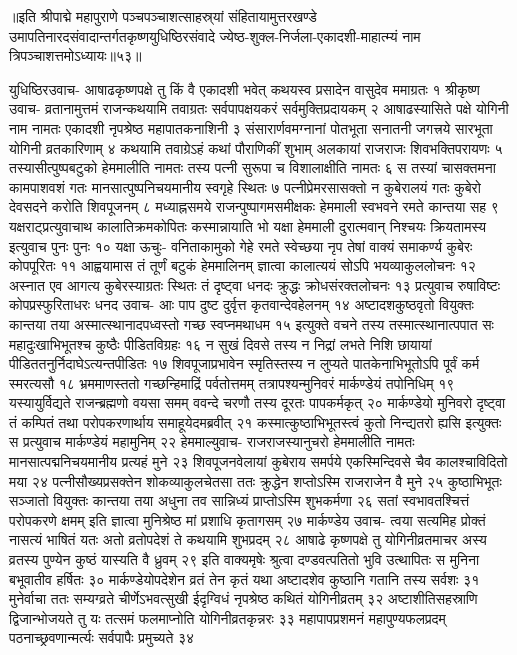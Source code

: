॥इति श्रीपाद्मे महापुराणे पञ्चपञ्चाशत्साहस्र्यां संहितायामुत्तरखण्डे उमापतिनारदसंवादान्तर्गतकृष्णयुधिष्ठिरसंवादे ज्येष्ठ-शुक्ल-निर्जला-एकादशी-माहात्म्यं नाम त्रिपञ्चाशत्तमोऽध्यायः॥५३॥



युधिष्ठिरउवाच-
आषाढकृष्णपक्षे तु किं वै एकादशी भवेत् 
कथयस्व प्रसादेन वासुदेव ममाग्रतः १
श्रीकृष्ण उवाच-
व्रतानामुत्तमं राजन्कथयामि तवाग्रतः 
सर्वपापक्षयकरं सर्वमुक्तिप्रदायकम् २
आषाढस्यासिते पक्षे योगिनी नाम नामतः 
एकादशी नृपश्रेष्ठ महापातकनाशिनी ३
संसारार्णवमग्नानां पोतभूता सनातनी 
जगत्त्रये सारभूता योगिनी व्रतकारिणाम् ४
कथयामि तवाग्रेऽहं कथां पौराणिकीं शुभाम् 
अलकायां राजराजः शिवभक्तिपरायणः ५
तस्यासीत्पुष्पबटुको हेममालीति नामतः 
तस्य पत्नी सुरूपा च विशालाक्षीति नामतः ६
स तस्यां चासक्तमना कामपाशवशं गतः 
मानसात्पुष्पनिचयमानीय स्वगृहे स्थितः ७
पत्नीप्रेमरसासक्तो न कुबेरालयं गतः 
कुबेरो देवसदने करोति शिवपूजनम् ८
मध्याह्नसमये राजन्पुष्पागमसमीक्षकः 
हेममाली स्वभवने रमते कान्तया सह ९
यक्षराट्प्रत्युवाचाथ कालातिक्रमकोपितः 
कस्मान्नायाति भो यक्षा हेममाली दुरात्मवान् 
निश्चयः क्रियतामस्य इत्युवाच पुनः पुनः १०
यक्षा ऊचुः-
वनिताकामुको गेहे रमते स्वेच्छया नृप 
तेषां वाक्यं समाकर्ण्य कुबेरः कोपपूरितः ११
आह्वयामास तं तूर्णं बटुकं हेममालिनम् 
ज्ञात्वा कालात्ययं सोऽपि भयव्याकुललोचनः १२
अस्नात एव आगत्य कुबेरस्याग्रतः स्थितः 
तं दृष्ट्वा धनदः क्रुद्धः क्रोधसंरक्तलोचनः १३
प्रत्युवाच रुषाविष्टः कोपप्रस्फुरिताधरः 
धनद उवाच-
आः पाप दुष्ट दुर्वृत्त कृतवान्देवहेलनम् १४
अष्टादशकुष्ठवृतो वियुक्तः कान्तया तया 
अस्मात्स्थानादपध्वस्तो गच्छ स्वप्नमथाधम १५
इत्युक्ते वचने तस्य तस्मात्स्थानात्पपात सः 
महादुःखाभिभूतश्च कुष्ठैः पीडितविग्रहः १६
न सुखं दिवसे तस्य न निद्रां लभते निशि 
छायायां पीडिततनुर्निदाघेऽत्यन्तपीडितः १७
शिवपूजाप्रभावेन स्मृतिस्तस्य न लुप्यते 
पातकेनाभिभूतोऽपि पूर्वं कर्म स्मरत्यसौ १८
भ्रममाणस्ततो गच्छन्हिमाद्रिं पर्वतोत्तमम् 
तत्रापश्यन्मुनिवरं मार्कण्डेयं तपोनिधिम् १९
यस्यायुर्विद्यते राजन्ब्रह्मणो वयसा समम् 
ववन्दे चरणौ तस्य दूरतः पापकर्मकृत् २०
मार्कण्डेयो मुनिवरो दृष्ट्वा तं कम्पितं तथा 
परोपकरणार्थाय समाहूयेदमब्रवीत् २१
कस्मात्कुष्ठाभिभूतस्त्वं कुतो निन्द्यतरो ह्यसि 
इत्युक्तः स प्रत्युवाच मार्कण्डेयं महामुनिम् २२
हेममाल्युवाच-
राजराजस्यानुचरो हेममालीति नामतः 
मानसात्पद्मनिचयमानीय प्रत्यहं मुने २३
शिवपूजनवेलायां कुबेराय समर्पये 
एकस्मिन्दिवसे चैव कालश्चाविदितो मया २४
पत्नीसौख्यप्रसक्तेन शोकव्याकुलचेतसा 
ततः क्रुद्धेन शप्तोऽस्मि राजराजेन वै मुने २५
कुष्ठाभिभूतः सञ्जातो वियुक्तः कान्तया तया 
अधुना तव सान्निध्यं प्राप्तोऽस्मि शुभकर्मणा २६
सतां स्वभावतश्चित्तं परोपकरणे क्षमम् 
इति ज्ञात्वा मुनिश्रेष्ठ मां प्रशाधि कृतागसम् २७
मार्कण्डेय उवाच-
त्वया सत्यमिह प्रोक्तं नासत्यं भाषितं यतः 
अतो व्रतोपदेशं ते कथयामि शुभप्रदम् २८
आषाढे कृष्णपक्षे तु योगिनीव्रतमाचर 
अस्य व्रतस्य पुण्येन कुष्ठं यास्यति वै ध्रुवम् २९
इति वाक्यमृषेः श्रुत्वा दण्डवत्पतितो भुवि 
उत्थापितः स मुनिना बभूवातीव हर्षितः ३०
मार्कण्डेयोपदेशेन व्रतं तेन कृतं यथा 
अष्टादशेव कुष्ठानि गतानि तस्य सर्वशः ३१
मुनेर्वाचा ततः सम्यग्व्रते चीर्णेऽभवत्सुखी 
ईदृग्विधं नृपश्रेष्ठ कथितं योगिनीव्रतम् ३२
अष्टाशीतिसहस्राणि द्विजान्भोजयते तु यः 
तत्समं फलमाप्नोति योगिनीव्रतकृन्नरः ३३
महापापप्रशमनं महापुण्यफलप्रदम् 
पठनाच्छ्रवणान्मर्त्यः सर्वपापैः प्रमुच्यते ३४

